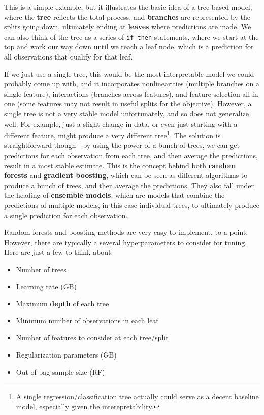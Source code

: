 \documentclass[
  letterpaper,
]{krantz}
\providecommand{\tightlist}{%
  \setlength{\itemsep}{0pt}\setlength{\parskip}{0pt}}\usepackage{longtable,booktabs,array}
\begin{document}
This is a simple example, but it illustrates the basic idea of a
tree-based model, where the \textbf{tree} reflects the total process,
and \textbf{branches} are represented by the splits going down,
ultimately ending at \textbf{leaves} where predictions are made. We can
also think of the tree as a series of \texttt{if-then} statements, where
we start at the top and work our way down until we reach a leaf node,
which is a prediction for all observations that qualify for that leaf.

If we just use a single tree, this would be the most interpretable model
we could probably come up with, and it incorporates nonlinearities
(multiple branches on a single feature), interactions (branches across
features), and feature selection all in one (some features may not
result in useful splits for the objective). However, a single tree is
not a very stable model unfortunately, and so does not generalize well.
For example, just a slight change in data, or even just starting with a
different feature, might produce a very different tree\footnote{A single
  regression/classification tree actually could serve as a decent
  baseline model, especially given the interepretability.}. The solution
is straightforward though - by using the power of a bunch of trees, we
can get predictions for each observation from each tree, and then
average the predictions, result in a most stable estimate. This is the
concept behind both \textbf{random forests} and \textbf{gradient
boosting}, which can be seen as different algorithms to produce a bunch
of trees, and then average the predictions. They also fall under the
heading of \textbf{ensemble models}, which are models that combine the
predictions of multiple models, in this case individual trees, to
ultimately produce a single prediction for each observation.

Random forests and boosting methods are very easy to implement, to a
point. However, there are typically a several hyperparameters to
consider for tuning. Here are just a few to think about:

\begin{itemize}
\tightlist
\item
  Number of trees
\item
  Learning rate (GB)
\item
  Maximum \textbf{depth} of each tree
\item
  Minimum number of observations in each leaf
\item
  Number of features to consider at each tree/split
\item
  Regularization parameters (GB)
\item
  Out-of-bag sample size (RF)
\end{itemize}
\end{document}
